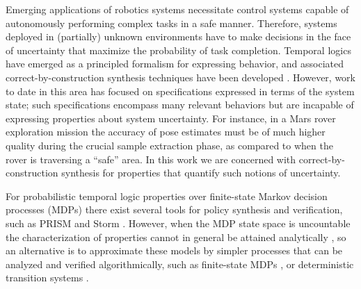 \documentclass{ifacconf}
\begin{document}
Emerging applications of robotics systems necessitate control systems capable of autonomously performing complex tasks in a safe manner. Therefore, systems deployed in (partially) unknown environments have to make decisions in the face of uncertainty that maximize the probability of task completion. Temporal logics have emerged as a principled formalism for expressing behavior, and associated correct-by-construction synthesis techniques have been developed \citep{Murray2009}. However, work to date in this area has focused on specifications expressed in terms of the system state; such specifications encompass many relevant behaviors but are incapable of expressing properties about system uncertainty. For instance, in a Mars rover exploration mission the accuracy of pose estimates must be of much higher quality during the crucial sample extraction phase, as compared to when the rover is traversing a ``safe'' area. In this work we are concerned with correct-by-construction synthesis for properties that quantify such notions of uncertainty.


For probabilistic temporal logic properties over finite-state Markov decision processes (MDPs) there exist several tools for policy synthesis and verification, such as PRISM \citep{KNP11} and  Storm \citep{dehnert2017storm}. However, when the MDP state space is uncountable the characterization of properties cannot in general be attained analytically \citep{Abate1}, so an alternative is to approximate these models by simpler processes that can be analyzed and verified algorithmically, such as finite-state MDPs \citep{soudjani2015faust}, or deterministic transition systems \citep{Zamani2014}. %
\end{document}
